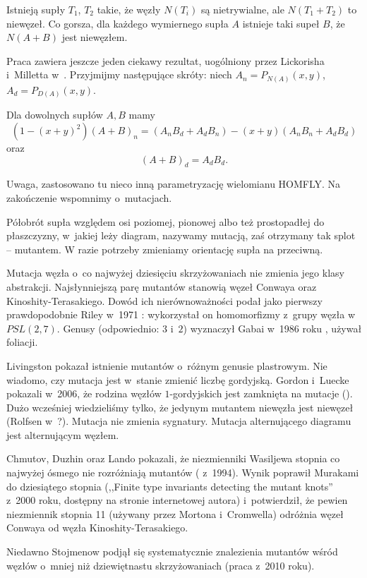 Istnieją supły $T_1$, $T_2$ takie, że węzły $N(T_i)$ są nietrywialne, ale $N(T_1 + T_2)$ to niewęzeł.
Co gorsza, dla każdego wymiernego supła $A$ istnieje taki supeł $B$, że $N(A+B)$ jest niewęzłem.

Praca \cite{conway70} zawiera jeszcze jeden ciekawy rezultat, uogólniony przez Lickorisha i~Milletta w~\cite{lickorish87}.
Przyjmijmy następujące skróty: niech $A_n = P_{N(A)}(x,y)$, $A_d = P_{D(A)}(x,y)$.

\begin{proposition}
    Dla dowolnych supłów $A, B$ mamy
    \[
    (1 - (x+y)^2)(A+B)_n = (A_nB_d + A_dB_n) - (x+y)(A_nB_n+  A_dB_d)
    \]
    oraz
    \[
        (A+B)_d = A_dB_d.
    \]
\end{proposition}

Uwaga, zastosowano tu nieco inną parametryzację wielomianu HOMFLY.
Na zakończenie wspomnimy o~mutacjach.

\begin{definition}[mutacja]
\label{def:mutant}
    Półobrót supła względem osi poziomej, pionowej albo też prostopadłej do płaszczyzny, w~jakiej leży diagram, nazywamy mutacją, zaś otrzymany tak splot -- mutantem.
    W razie potrzeby zmieniamy orientację supła na przeciwną.
\end{definition}

Mutacja węzła o~co najwyżej dziesięciu skrzyżowaniach nie zmienia jego klasy abstrakcji.
Najsłynniejszą parę mutantów stanowią węzeł Conwaya oraz Kinoshity-Terasakiego.
Dowód ich nierównoważności podał jako pierwszy prawdopodobnie Riley w~1971 \cite{riley71}:
wykorzystał on homomorfizmy z~grupy węzła w~$PSL(2, 7)$.
Genusy (odpowiednio: $3$ i~$2$) wyznaczył Gabai w~1986 roku \cite{gabai86}, używał foliacji.

Livingston pokazał istnienie mutantów o~różnym genusie plastrowym.
Nie wiadomo, czy mutacja jest w~stanie zmienić liczbę gordyjską.
Gordon i~Luecke pokazali w~2006, że rodzina węzłów $1$-gordyjskich jest zamknięta na mutacje (\cite{gordon06}).
Dużo wcześniej wiedzieliśmy tylko, że jedynym mutantem niewęzła jest niewęzeł (Rolfsen w~\cite{rolfsen93}?).
Mutacja nie zmienia sygnatury.
Mutacja alternującego diagramu jest alternującym węzłem.

Chmutov, Duzhin oraz Lando pokazali, że niezmienniki Wasiljewa stopnia co najwyżej ósmego nie rozróżniają mutantów (\cite{chmutov94} z~1994).
Wynik poprawił Murakami do dziesiątego stopnia (,,Finite type invariants detecting the mutant knots'' z~2000 roku, dostępny na stronie internetowej autora) i~potwierdził, że pewien niezmiennik stopnia 11 (używany przez Mortona i~Cromwella) odróżnia węzeł Conwaya od węzła Kinoshity-Terasakiego.

Niedawno Stojmenow podjął się systematycznie znalezienia mutantów wśród węzłów o~mniej niż dziewiętnastu skrzyżowaniach (praca \cite{stoimenow10} z~2010 roku).



